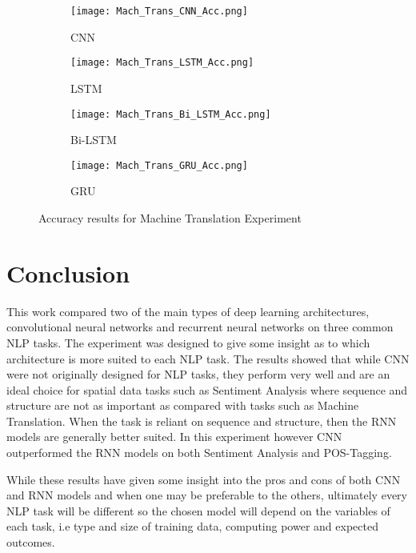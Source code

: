 \documentclass[twocolumn,12pt]{asme2ej}
\begin{document}
\begin{figure}[htb]
    \begin{subfigure}[b]{0.25\columnwidth}
        \texttt{[image: Mach\_Trans\_CNN\_Acc.png]}
    \caption{CNN}
    \label{fig:bear}%
\end{subfigure}\hfill
\begin{subfigure}[b]{0.25\columnwidth}
        \texttt{[image: Mach\_Trans\_LSTM\_Acc.png]}
    \caption{LSTM}
    \label{fig:lion}%
\end{subfigure}\hfill
\begin{subfigure}[b]{0.25\columnwidth}
        \texttt{[image: Mach\_Trans\_Bi\_LSTM\_Acc.png]}
    \caption{Bi-LSTM}
        \label{fig:tiger}
\end{subfigure}\hfill%
\begin{subfigure}[b]{0.25\columnwidth}
        \texttt{[image: Mach\_Trans\_GRU\_Acc.png]}
    \caption{GRU}
        \label{fig:mouse}
\end{subfigure}
\caption{Accuracy results for Machine Translation Experiment}
\label{figure_in_line}
    \end{figure}

\clearpage
\newpage

\twocolumn
\section{Conclusion}

This work compared two of the main types of deep learning architectures, convolutional neural networks and recurrent neural networks on three common NLP tasks. The experiment was designed to give some insight as to which architecture is more suited to each NLP task. The results showed that while CNN were not originally designed for NLP tasks, they perform very well and are an ideal choice for spatial data tasks such as Sentiment Analysis where sequence and structure are not as important as compared with tasks such as Machine Translation. When the task is reliant on sequence and structure, then the RNN models are generally better suited. In this experiment however CNN outperformed the RNN models on both Sentiment Analysis and POS-Tagging.

While these results have given some insight into the pros and cons of both CNN and RNN models and when one may be preferable to the others, ultimately every NLP task will be different so the chosen model will depend on the variables of each task, i.e type and size of training data, computing power and expected outcomes.
\end{document}
